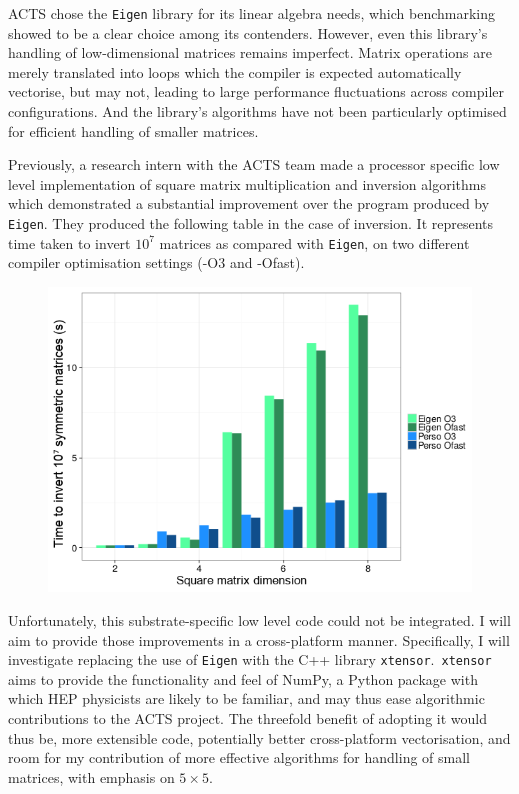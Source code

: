 \documentclass[12pt]{amsart}
\begin{document}
ACTS chose the \texttt{Eigen} library for its linear algebra needs, which benchmarking showed to be a clear choice among its contenders. However, even this library's handling of low-dimensional matrices remains imperfect. Matrix operations are merely translated into loops which the compiler is expected automatically vectorise, but may not, leading to large performance fluctuations across compiler configurations. And the library's algorithms have not been particularly optimised for efficient handling of smaller matrices.

Previously, a research intern with the ACTS team made a processor specific low level implementation of square matrix multiplication and inversion algorithms which demonstrated a substantial improvement over the program produced by \texttt{Eigen}. They produced the following table in the case of inversion. It represents time taken to invert $10^7$ matrices as compared with \texttt{Eigen}, on two different compiler optimisation settings (-O3 and -Ofast).

\begin{figure}[h]
\includegraphics[scale=0.4]{Invert}
\centering
\end{figure}

Unfortunately, this substrate-specific low level code could not be integrated. I will aim to provide those improvements in a cross-platform manner. Specifically, I will investigate replacing the use of \texttt{Eigen} with the C++ library \texttt{xtensor}.\ \texttt{xtensor} aims to provide the functionality and feel of NumPy, a Python package with which HEP physicists are likely to be familiar, and may thus ease algorithmic contributions to the ACTS project. The threefold benefit of adopting it would thus be, more extensible code, potentially better cross-platform vectorisation, and room for my contribution of more effective algorithms for handling of small matrices, with emphasis on $5 \times 5$.
\end{document}
